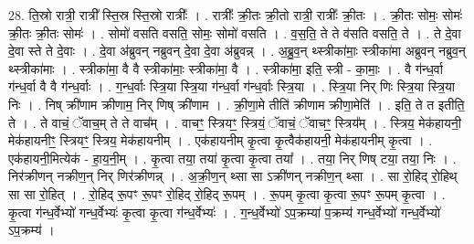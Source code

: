 \documentclass[17pt]{extarticle}
\begin{document}
28. ति॒स्रो रात्री॒ रात्री᳚ स्ति॒स्र स्ति॒स्रो रात्रीः᳚ । . रात्रीः᳚ क्री॒तः क्री॒तो रात्री॒ रात्रीः᳚ क्री॒तः । . क्री॒तः सोमः॒ सोमः॑ क्री॒तः क्री॒तः सोमः॑ । . सोमो॑ वसति वसति॒ सोमः॒ सोमो॑ वसति । . व॒स॒ति॒ ते ते व॑सति वसति॒ ते । . ते दे॒वा दे॒वा स्ते ते दे॒वाः । . दे॒वा अ॑ब्रुवन् नब्रुवन् दे॒वा दे॒वा अ॑ब्रुवन्न् । . अ॒ब्रु॒व॒न् थ्स्त्रीका॑माः॒ स्त्रीका॑मा अब्रुवन् नब्रुव॒न् थ्स्त्रीका॑माः । . स्त्रीका॑मा॒ वै वै स्त्रीका॑माः॒ स्त्रीका॑मा॒ वै । . स्त्रीका॑मा॒ इति॒ स्त्री - का॒माः॒ । . वै ग॑न्ध॒र्वा ग॑न्ध॒र्वा वै वै ग॑न्ध॒र्वाः । . ग॒न्ध॒र्वाः स्त्रि॒या स्त्रि॒या ग॑न्ध॒र्वा ग॑न्ध॒र्वाः स्त्रि॒या । . स्त्रि॒या निर् णिः स्त्रि॒या स्त्रि॒या निः । . निष् क्री॑णाम क्रीणाम॒ निर् णिष् क्री॑णाम । . क्री॒णा॒मे तीति॑ क्रीणाम क्रीणा॒मेति॑ । . इति॒ ते त इतीति॒ ते । . ते वाचं॒ ॅवाच॒म् ते ते वाच᳚म् । . वाचꣳ॒॒ स्त्रियꣳ॒॒ स्त्रियं॒ ॅवाचं॒ ॅवाचꣳ॒॒ स्त्रिय᳚म् । . स्त्रिय॒ मेक॑हायनी॒ मेक॑हायनीꣳ॒॒ स्त्रियꣳ॒॒ स्त्रिय॒ मेक॑हायनीम् । . एक॑हायनीम् कृ॒त्वा कृ॒त्वैक॑हायनी॒ मेक॑हायनीम् कृ॒त्वा । . एक॑हायनी॒मित्येक॑ - हा॒य॒नी॒म् । . कृ॒त्वा तया॒ तया॑ कृ॒त्वा कृ॒त्वा तया᳚ । . तया॒ निर् णिष् टया॒ तया॒ निः । . निर॑क्रीणन् नक्रीण॒न् निर् णिर॑क्रीणन्न् । . अ॒क्री॒ण॒न् थ्सा सा ऽक्री॑णन् नक्रीण॒न् थ्सा । . सा रो॒हिद् रो॒हिथ् सा सा रो॒हित् । . रो॒हिद् रू॒पꣳ रू॒पꣳ रो॒हिद् रो॒हिद् रू॒पम् । . रू॒पम् कृ॒त्वा कृ॒त्वा रू॒पꣳ रू॒पम् कृ॒त्वा । . कृ॒त्वा ग॑न्ध॒र्वेभ्यो॑ गन्ध॒र्वेभ्यः॑ कृ॒त्वा कृ॒त्वा ग॑न्ध॒र्वेभ्यः॑ । . ग॒न्ध॒र्वेभ्यो॑ ऽप॒क्रम्या॑ प॒क्रम्य॑ गन्ध॒र्वेभ्यो॑ गन्ध॒र्वेभ्यो॑ ऽप॒क्रम्य॑ । \newline
\end{document}
